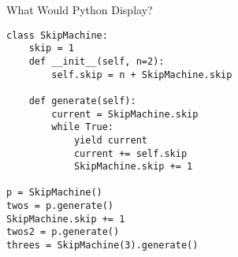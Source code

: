 
\begin{blocksection}
\question What Would Python Display?
\begin{lstlisting}
class SkipMachine:
    skip = 1
    def __init__(self, n=2):
        self.skip = n + SkipMachine.skip

    def generate(self):
        current = SkipMachine.skip
        while True:
            yield current
            current += self.skip
            SkipMachine.skip += 1

p = SkipMachine()
twos = p.generate()
SkipMachine.skip += 1
twos2 = p.generate()
threes = SkipMachine(3).generate()
\end{lstlisting}
\end{blocksection}


